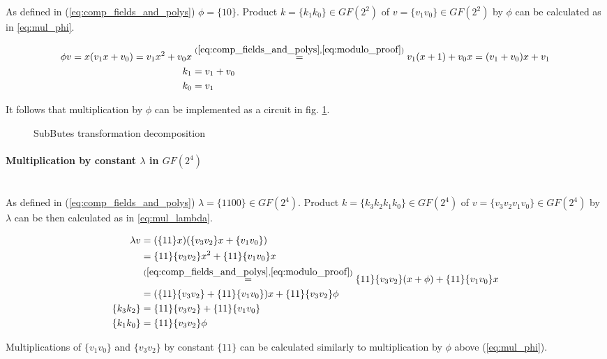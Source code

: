 As defined in (\ref{eq:comp_fields_and_polys}) \cite{vlsi} $\phi = \{10\}$. Product $k = \{k_1k_0\} \in GF(2^2)$ of $v = \{v_1v_0\} \in GF(2^2)$ by $\phi$ can be calculated as in \ref{eq:mul_phi}.

\begin{equation}
\label{eq:mul_phi}
\begin{aligned}
\phi v = x (v_1x + v_0) = v_1x^2 + v_0x &\stackrel{(\ref{eq:comp_fields_and_polys}, \ref{eq:modulo_proof})}{=} v_1(x + 1) + v_0x = (v_1 + v_0)x + v_1\\
k_1 &= v_1 + v_0\\
k_0 &= v_1
\end{aligned}
\end{equation}

It follows that multiplication by $\phi$ can be implemented as a circuit in fig. \ref{fig:phi_mul}.

\begin{figure}[!h]
\label{fig:phi_mul}
\missingfigure[figwidth=6cm]{}
\caption{SubButes transformation decomposition}
\end{figure}


\paragraph{Multiplication by constant $\lambda$ in $GF(2^4)$}\mbox{}\\
As defined in (\ref{eq:comp_fields_and_polys}) \cite{vlsi} $\lambda = \{1100\} \in GF(2^4)$. Product $k = \{k_3k_2k_1k_0\} \in GF(2^4)$ of $v = \{v_3v_2v_1v_0\} \in GF(2^4)$ by $\lambda$ can be then calculated as in \ref{eq:mul_lambda}.

\begin{equation}
\label{eq:mul_lambda}
\begin{aligned}
\lambda v &= (\{11\}x) (\{v_3v_2\}x + \{v_1v_0\})\\
&= \{11\}\{v_3v_2\}x^2 + \{11\}\{v_1v_0\}x\\
&\stackrel{(\ref{eq:comp_fields_and_polys}, \ref{eq:modulo_proof})}{=}
\{11\}\{v_3v_2\}(x + \phi) + \{11\}\{v_1v_0\}x \\
&= (\{11\}\{v_3v_2\} + \{11\}\{v_1v_0\})x + \{11\}\{v_3v_2\}\phi\\
\{k_3k_2\} &= \{11\}\{v_3v_2\} + \{11\}\{v_1v_0\}\\
\{k_1k_0\} &= \{11\}\{v_3v_2\}\phi
\end{aligned}
\end{equation}

Multiplications of $\{v_1v_0\}$ and $\{v_3v_2\}$ by constant $\{11\}$ can be calculated similarly to multiplication by $\phi$ above (\ref{eq:mul_phi}).

